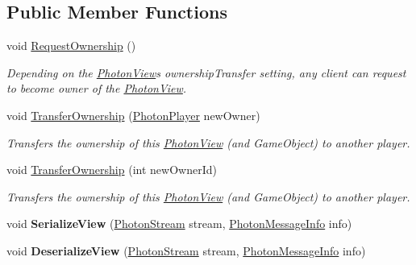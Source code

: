 \subsection*{Public Member Functions}
\begin{DoxyCompactItemize}
\item 
void \hyperlink{class_photon_view_a0eee05bdd9c48c263a41ccfec45b8651}{Request\+Ownership} ()
\begin{DoxyCompactList}\small\item\em Depending on the \hyperlink{class_photon_view}{Photon\+View}\textquotesingle{}s ownership\+Transfer setting, any client can request to become owner of the \hyperlink{class_photon_view}{Photon\+View}. \end{DoxyCompactList}\item 
void \hyperlink{class_photon_view_a484df6eca8208330c00c317334dd8115}{Transfer\+Ownership} (\hyperlink{class_photon_player}{Photon\+Player} new\+Owner)
\begin{DoxyCompactList}\small\item\em Transfers the ownership of this \hyperlink{class_photon_view}{Photon\+View} (and Game\+Object) to another player. \end{DoxyCompactList}\item 
void \hyperlink{class_photon_view_ad892c308b04787c06907120e64f6bc03}{Transfer\+Ownership} (int new\+Owner\+Id)
\begin{DoxyCompactList}\small\item\em Transfers the ownership of this \hyperlink{class_photon_view}{Photon\+View} (and Game\+Object) to another player. \end{DoxyCompactList}\item 
void {\bfseries Serialize\+View} (\hyperlink{class_photon_stream}{Photon\+Stream} stream, \hyperlink{class_photon_message_info}{Photon\+Message\+Info} info)\hypertarget{class_photon_view_af1871faa617868760d00e59d443d2ad8}{}\label{class_photon_view_af1871faa617868760d00e59d443d2ad8}

\item 
void {\bfseries Deserialize\+View} (\hyperlink{class_photon_stream}{Photon\+Stream} stream, \hyperlink{class_photon_message_info}{Photon\+Message\+Info} info)\hypertarget{class_photon_view_a677557c203df8f79277095ce5f9da001}{}\label{class_photon_view_a677557c203df8f79277095ce5f9da001}


\end{DoxyCompactItemize}
